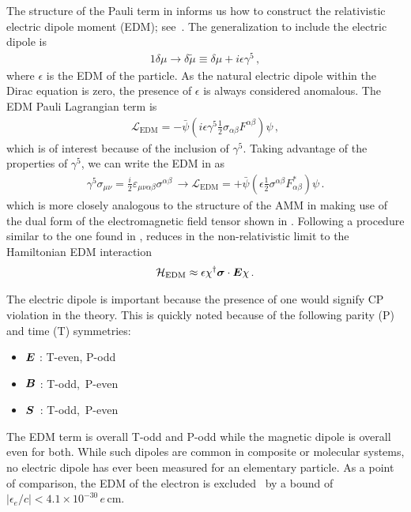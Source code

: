 The structure of the Pauli term in  informs us how to construct the relativistic electric dipole moment (EDM); see~\cite{Knecht:2003kc,Jegerlehner:2017gek}. The generalization to include the electric dipole is
\begin{alignat}{1}
	\label{edm:1} \delta\mu\rightarrow\delta\tilde{\mu}\equiv\delta\mu+i\epsilon\gamma^{5}\,,
\end{alignat}
where $\epsilon$ is the EDM of the particle. As the natural electric dipole within the Dirac equation is zero, the presence of $\epsilon$ is always considered anomalous. The EDM Pauli Lagrangian term is
\begin{gather}
    \label{ledm:1}
    \mathcal{L}_\mathrm{EDM} = -{\bar\psi}\left(i\epsilon\gamma^{5}\frac{1}{2}\sigma_{\alpha\beta}F^{\alpha\beta}\right)\psi\,,
\end{gather}
which is of interest because of the inclusion of $\gamma^{5}$. Taking advantage of the properties of $\gamma^{5}$, we can write the EDM in  as
\begin{gather}
    \label{ledm:3}
    \gamma^{5}\sigma_{\mu\nu}=\frac{i}{2}\varepsilon_{\mu\nu\alpha\beta}\sigma^{\alpha\beta}\,\rightarrow
    \mathcal{L}_\mathrm{EDM} = +{\bar\psi}\left(\epsilon\frac{1}{2}\sigma^{\alpha\beta}F_{\alpha\beta}^{*}\right)\psi\,.
\end{gather}
which is more closely analogous to the structure of the AMM in  making use of the dual form of the electromagnetic field tensor shown in . Following a procedure similar to the one found in ,  reduces in the non-relativistic limit to the Hamiltonian EDM interaction
\begin{gather}
    \label{ledm:4}
    \mathcal{H}_\mathrm{EDM} \approx \epsilon\chi^{\dag}\boldsymbol{\sigma}\cdot\boldsymbol{E}\chi\,.
\end{gather}

The electric dipole is important because the presence of one would signify CP violation in the theory. This is quickly noted because of the following parity (P) and time (T) symmetries:
\begin{itemize}[nosep]
    \item $\boldsymbol{E}$ : T-even, P-odd
    \item $\boldsymbol{B}$ : T-odd, \,P-even
    \item $\boldsymbol{S}$ \,: T-odd, \,P-even
\end{itemize}
The EDM term  is overall T-odd and P-odd while the magnetic dipole is overall even for both. While such dipoles are common in composite or molecular systems, no electric dipole has ever been measured for an elementary particle. As a point of comparison, the EDM of the electron is excluded~\citep{ACME:2018yjb,Roussy:2022cmp} by a bound of $|\epsilon_{e}/c|<4.1\times10^{-30}\, e\,\mathrm{cm}$.

